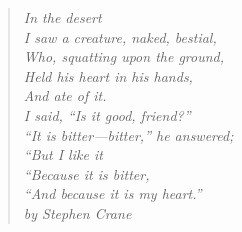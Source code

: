 \clearpage
\vspace*{\fill}
\thispagestyle{empty} %
\begin{quotation}
\em %
\noindent In the desert \\
I saw a creature, naked, bestial, \\
Who, squatting upon the ground, \\
Held his heart in his hands, \\
And ate of it. \\
I said, ``Is it good, friend?'' \\
``It is bitter—bitter,” he answered; \\

\noindent ``But I like it \\
``Because it is bitter, \\
``And because it is my heart.'' \\

\medskip
\raggedleft
by Stephen Crane
\end{quotation}
\vspace*{\fill}